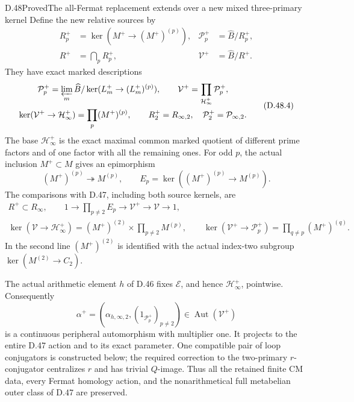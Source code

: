 \begin{statement}{D.48}{Proved}{The all-Fermat replacement extends over a new mixed three-primary kernel}
Define the new relative sources by
\[
 \begin{aligned}
 R_p^+&=\ker(M^+\to(M^+)^{(p)}),&
 \mathcal P_p^+&=\widehat B/R_p^+,\\
 R^+&=\bigcap_pR_p^+,&
 \mathcal V^+&=\widehat B/R^+.
 \end{aligned}                                                     \tag{D.48.3}
\]
They have exact marked descriptions
\[
 \begin{gathered}
 \mathcal P_p^+
   =\varprojlim_m\widehat B/
                \ker(L_m^+\to(L_m^+)^{(p)}),\qquad
 \mathcal V^+=\prod_{\mathcal H^+_\infty}\mathcal P_p^+,\\
 \ker(\mathcal V^+\to\mathcal H^+_\infty)
      =\prod_p(M^+)^{(p)},\qquad
 R_2^+=R_{\infty,2},\quad
 \mathcal P_2^+=\mathcal P_{\infty,2}.
 \end{gathered}                                                   \tag{D.48.4}
\]
The base \(\mathcal H^+_\infty\) is the exact maximal common
marked quotient of different prime factors and of one factor
with all the remaining ones. For odd \(p\), the actual inclusion
\(M^+\subset M\) gives an epimorphism
\[
 (M^+)^{(p)}\twoheadrightarrow M^{(p)},\qquad
 E_p=\ker((M^+)^{(p)}\to M^{(p)}).
\]
The comparisons with D.47, including both source kernels, are
\[
 \begin{gathered}
 R^+\subset R_\infty,\qquad
 1\longrightarrow\prod_{p\ne2}E_p
       \longrightarrow\mathcal V^+
       \longrightarrow\mathcal V\longrightarrow1,\\
 \ker(\mathcal V\to\mathcal H^+_\infty)
      =(M^+)^{(2)}\times\prod_{p\ne2}M^{(p)},\qquad
 \ker(\mathcal V^+\to\mathcal P_p^+)
      =\prod_{q\ne p}(M^+)^{(q)}.
 \end{gathered}                                                   \tag{D.48.5}
\]
In the second line \((M^+)^{(2)}\) is identified with the actual
index-two subgroup \(\ker(M^{(2)}\to C_2)\).

The actual arithmetic element \(h\) of D.46 fixes
\(\mathcal E\), and hence \(\mathcal H^+_\infty\), pointwise.
Consequently
\[
 \alpha^+=(\alpha_{h,\infty,2},(1_{\mathcal P_p^+})_{p\ne2})
       \in\operatorname{Aut}(\mathcal V^+)                       \tag{D.48.6}
\]
is a continuous peripheral automorphism with multiplier one.
It projects to the entire D.47 action and to its exact parameter.
One compatible pair of loop conjugators is constructed below;
the required correction to the two-primary \(r\)-conjugator
centralizes \(r\) and has trivial \(Q\)-image. Thus all the
retained finite CM data, every Fermat homology action, and the
nonarithmetical full metabelian outer class of D.47 are preserved.


\end{statement}
